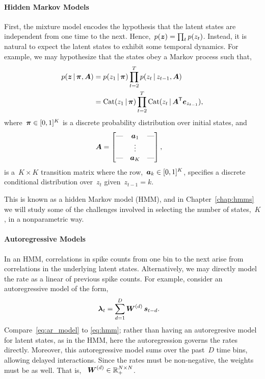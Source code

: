 \paragraph{Hidden Markov Models}
First, the mixture model encodes the hypothesis that the latent states
are independent from one time to the next.
Hence,~$p(\boldsymbol{z})=\prod_{t} p(z_t)$.  Instead, it is natural to expect
the latent states to exhibit some temporal dynamics. For example, we
may hypothesize that the states obey a Markov process such that,
\begin{align}
  p(\boldsymbol{z} \,|\, \boldsymbol{\pi}, \boldsymbol{A}) &= p(z_1 \,|\, \boldsymbol{\pi}) \prod_{t=2}^T p(z_t \,|\, z_{t-1}, \boldsymbol{A}) \\ 
  \label{eq:hmm}
  &= \mathrm{Cat}(z_1 \,|\, \boldsymbol{\pi}) \prod_{t=2}^T \mathrm{Cat}(z_t \,|\, \boldsymbol{A}^{\mathsf{T}} \boldsymbol{e}_{z_{t-1}}),
\end{align}
where~$\boldsymbol{\pi} \in [0,1]^K$ is a discrete probability distribution over
initial states, and
\begin{align}
  \boldsymbol{A} &=
        \begin{bmatrix}
          \text{---} &  \boldsymbol{a}_{1}  & \text{---} \\
            &  \vdots &   \\
          \text{---} &  \boldsymbol{a}_{K}  & \text{---}
        \end{bmatrix},
\end{align}
is a~${K \times K}$ transition matrix where the
row,~${\boldsymbol{a}_{k} \in [0,1]^K}$, specifies a discrete conditional
distribution over~$z_t$ given~${z_{t-1}=k}$.

This is known as a hidden Markov model (HMM), and in Chapter~\ref{chap:hmms} we 
will study some of the challenges involved in selecting the number of states,~$K$,
in a nonparametric way.

\paragraph{Autoregressive Models}
In an HMM, correlations in spike counts from one bin to the next arise from 
correlations in the underlying latent states. Alternatively, we may directly 
model the rate as a linear of previous spike counts. For example, consider 
an autoregressive model of the form,
\begin{align}
  \label{eq:ar_model}
  \boldsymbol{\lambda}_{t} &= \sum_{d=1}^D \boldsymbol{W}^{(d)} \, \boldsymbol{s}_{t-d}.
\end{align}
Compare~\eqref{eq:ar_model} to \eqref{eq:hmm}; rather than having an
autoregresive model for latent states, as in the HMM, here the
autoregression governs the rates directly.  Moreover, this
autoregressive model sums over the past~$D$ time bins, allowing
delayed interactions.  Since the rates must be non-negative, the
weights must be as well.  That is,
~$\boldsymbol{W}^{(d)} \in \mathbb{R}_+^{N \times N}$.


